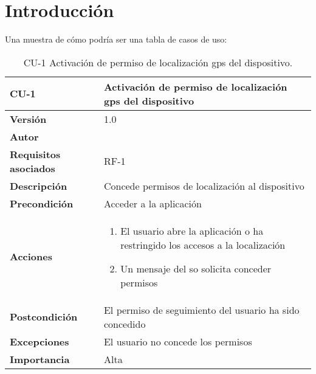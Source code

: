 
\section{Introducción}

Una muestra de cómo podría ser una tabla de casos de uso:

\begin{table}[p]
	\centering
	\begin{tabularx}{\linewidth}{ p{} p{} }
		\toprule
		\textbf{CU-1}    & \textbf{Activación de permiso de localización \acrshort{gps} del dispositivo}\\
		\toprule
		\textbf{Versión}              & 1.0    \\
		\textbf{Autor}                & \autor \\
		\textbf{Requisitos asociados} & RF-1 \\
		\textbf{Descripción}          & Concede permisos de localización al dispositivo \\
		\textbf{Precondición}         & Acceder a la aplicación \\
		\textbf{Acciones}             &
		\begin{enumerate}
			\def\labelenumi{\arabic{enumi}.}
			\tightlist
			\item El usuario abre la aplicación o ha restringido los accesos a la localización
			\item Un mensaje del \acrfull{so} solicita conceder permisos
		\end{enumerate}\\
		\textbf{Postcondición}        & El permiso de seguimiento del usuario ha sido concedido \\
		\textbf{Excepciones}          & El usuario no concede los permisos \\
		\textbf{Importancia}          & Alta  \\
		\bottomrule
	\end{tabularx}
	\caption{CU-1 Activación de permiso de localización \acrshort{gps} del dispositivo.}
\end{table}

